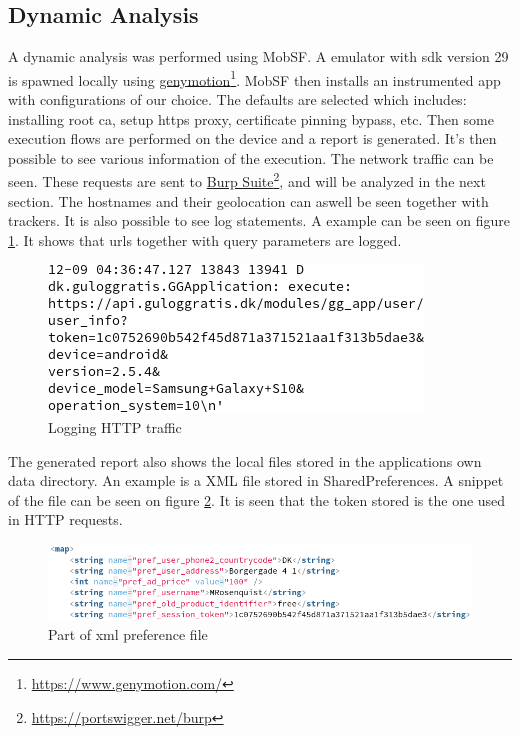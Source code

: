 \subsection{Dynamic Analysis}
A dynamic analysis was performed using MobSF. A emulator with sdk version 29 is spawned locally using \href{https://www.genymotion.com/}{genymotion}\footnote{\href{https://www.genymotion.com/}{https://www.genymotion.com/}}. MobSF then installs an instrumented app with configurations of our choice. The defaults are selected which includes: installing root ca, setup https proxy, certificate pinning bypass, etc. Then some execution flows are performed on the device and a report is generated. It's then possible to see various information of the execution. The network traffic can be seen. These requests are sent to \href{https://portswigger.net/burp}{Burp Suite}\footnote{\href{https://portswigger.net/burp}{https://portswigger.net/burp}}, and will be analyzed in the next section. The hostnames and their geolocation can aswell be seen together with trackers. It is also possible to see log statements. A example can be seen on figure \ref{fig:log-login-request}. It shows that urls together with query parameters are logged.  

\begin{figure}[htbp]
    \centering
    \includegraphics[width=1\columnwidth]{../static-analysis/pictures/log-login-request.png}
    \caption{Logging HTTP traffic}
    \label{fig:log-login-request}
\end{figure}

The generated report also shows the local files stored in the applications own data directory. An example is a XML file stored in SharedPreferences. A snippet of the file can be seen on figure \ref{fig:gull-prefs-xml}. It is seen that the token stored is the one used in HTTP requests.  

\begin{figure}[htbp]
    \centering
    \includegraphics[width=1\columnwidth]{../static-analysis/pictures/gull-prefs-xml.png}
    \caption{Part of xml preference file}
    \label{fig:gull-prefs-xml}
\end{figure}